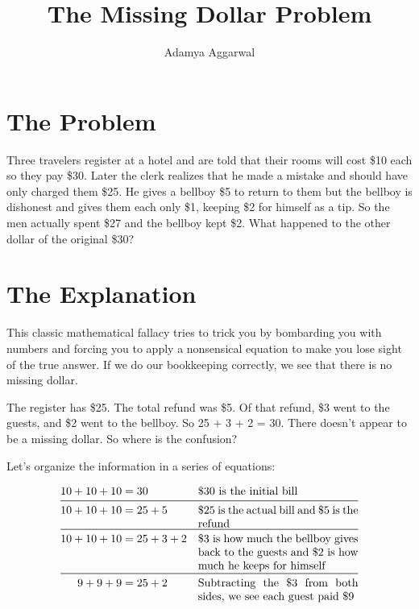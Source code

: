 \title{The Missing Dollar Problem}



\author{Adamya Aggarwal}
\maketitle


\section*{The Problem}
Three travelers register at a hotel and are told that their rooms will cost \$10 each so they pay \$30. Later the clerk realizes that he made a mistake and should have only charged them \$25. He gives a bellboy \$5 to return to them but the bellboy is dishonest and gives them each only \$1, keeping \$2 for himself as a tip. So the men actually spent \$27 and the bellboy kept \$2. What happened to the other dollar of the original \$30?

\section*{The Explanation}
This classic mathematical fallacy tries to trick you by bombarding you with numbers and forcing you to apply a nonsensical equation to make you lose sight of the true answer. If we do our bookkeeping correctly, we see that there is no missing dollar. 

The register has \$25. The total refund was \$5. Of that refund, \$3 went to the guests, and \$2 went to the bellboy. So 25 + 3 + 2 = 30. There doesn’t appear to be a missing dollar. So where is the confusion?

Let’s organize the information in a series of equations:

\vspace{-5mm}

\begin{align*}
    10 + 10 + 10 &= 30 && \text{\$30 is the initial bill} \\
    \midrule
    10 + 10 + 10 &= 25 + 5 && \parbox[t]{5cm}{
          \$25 is the actual bill and \$5 is the refund} \\
    \midrule
    10 + 10 + 10 &= 25 + 3 + 2 && \parbox[t]{5cm}{
          \$3 is how much the bellboy gives back to the guests and \$2 is how much he keeps for himself} \\
    \midrule
    9 + 9 + 9 &= 25 + 2 && \parbox[t]{5cm}{
            Subtracting the \$3 from both sides, we see each guest paid \$9}
\end{align*}

